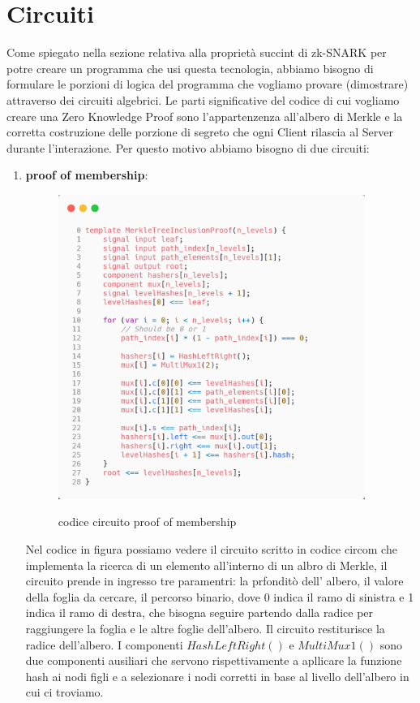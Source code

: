 \section{Circuiti}
Come spiegato nella sezione relativa alla proprietà succint di zk-SNARK per potre creare un programma che usi questa tecnologia, abbiamo bisogno di formulare le porzioni di logica del programma che vogliamo provare (dimostrare) attraverso dei circuiti algebrici. Le parti significative del codice di cui vogliamo creare una Zero Knowledge Proof sono l'appartenzenza all'albero di Merkle e la corretta costruzione delle porzione di segreto che ogni Client rilascia al Server durante l'interazione. Per questo motivo abbiamo bisogno di due circuiti:
\begin{enumerate}
    \item \textbf{proof of membership}:
    \begin{figure}[H]
        \centering
        \includegraphics[width=10cm]{./chapters/3.poc/images/1.merkle_proof.png}
        \label{fig:merkle_proof}
        \captionsetup{justification=centering}
        \caption{codice circuito proof of membership}
    \end{figure}
    Nel codice in figura possiamo vedere il circuito scritto in codice circom che implementa la ricerca di un elemento all'interno di un albro di Merkle, il circuito prende in ingresso tre paramentri: la prfonditò dell' albero, il valore della foglia da cercare, il percorso binario, dove 0 indica il ramo di sinistra e 1 indica il ramo di destra, che bisogna seguire partendo dalla radice per raggiungere la foglia e le altre foglie dell'albero. Il circuito restiturisce la radice dell'albero. I componenti $HashLeftRight()$ e $MultiMux1()$ sono due componenti ausiliari che servono rispettivamente a apllicare la funzione hash ai nodi figli e a selezionare i nodi corretti in base al livello dell'albero in cui ci troviamo.

\end{enumerate}
